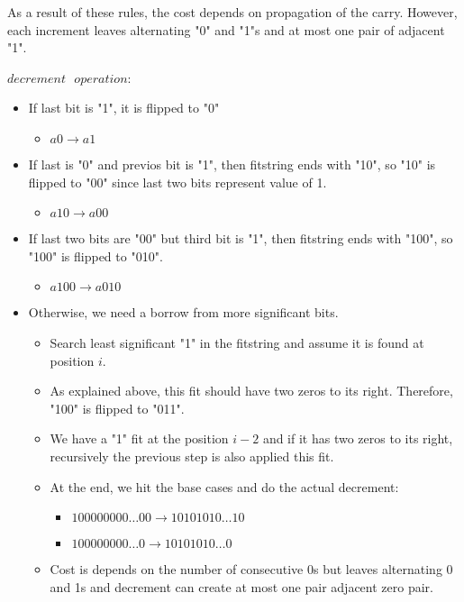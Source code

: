 As a result of these rules, the cost depends on propagation of the carry. However, each increment leaves alternating "0" and "1"s and at most one pair of adjacent "1".

\clearpage

$decrement\text{ }operation$: \\
\vspace{-0.3cm}
\begin{itemize}
\item If last bit is "1", it is flipped to "0"
\begin{itemize}
\item $a0 \rightarrow a1$
\end{itemize}
\item If last is "0" and previos bit is "1", then fitstring ends with "10", so "10" is flipped to "00" since last two bits represent value of 1.
\begin{itemize}
\item $a10 \rightarrow a00$
\end{itemize}
\item If last two bits are "00" but third bit is "1", then fitstring ends with "100", so "100" is flipped to "010".
\begin{itemize}
\item $a100 \rightarrow a010$
\end{itemize}
\item Otherwise, we need a borrow from more significant bits.
\begin{itemize}
\item Search least significant "1" in the fitstring and assume it is found at position $i$.
\item As explained above, this fit should have two zeros to its right. Therefore, "100" is flipped to "011".
\item We have a "1" fit at the position $i-2$ and if it has two zeros to its right, recursively the previous step is also applied this fit.
\item At the end, we hit the base cases and do the actual decrement:
\begin{itemize}
\item $100000000\dots00 \rightarrow 10101010\dots10$
\item $100000000\dots0 \rightarrow 10101010\dots0$
\end{itemize}
\item Cost is depends on the number of consecutive 0s but leaves alternating 0 and 1s and decrement can create at most one pair adjacent zero pair.
\end{itemize}
\end{itemize}

